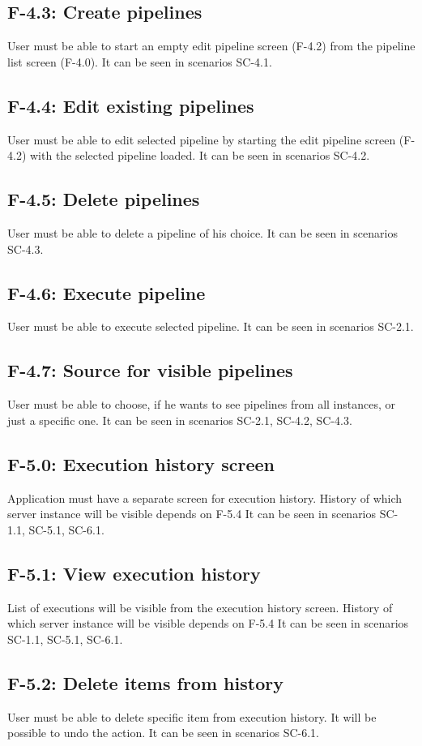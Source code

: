 \subsection*{F-4.3: Create pipelines}
User must be able to start an empty edit pipeline screen (F-4.2) from the pipeline list screen (F-4.0). It can be seen in scenarios SC-4.1.
\subsection*{F-4.4: Edit existing pipelines}
User must be able to edit selected pipeline by starting the edit pipeline screen (F-4.2) with the selected pipeline loaded. It can be seen in scenarios SC-4.2.
\subsection*{F-4.5: Delete pipelines}
User must be able to delete a pipeline of his choice. It can be seen in scenarios SC-4.3.
\subsection*{F-4.6: Execute pipeline}
User must be able to execute selected pipeline. It can be seen in scenarios SC-2.1.
\subsection*{F-4.7: Source for visible pipelines}
User must be able to choose, if he wants to see pipelines from all instances, or just a specific one. It can be seen in scenarios SC-2.1, SC-4.2, SC-4.3.
\subsection*{F-5.0: Execution history screen}
Application must have a separate screen for execution history. History of which server instance will be visible depends on F-5.4 It can be seen in scenarios SC-1.1, SC-5.1, SC-6.1.
\subsection*{F-5.1: View execution history}
List of executions will be visible from the execution history screen. History of which server instance will be visible depends on F-5.4 It can be seen in scenarios SC-1.1, SC-5.1, SC-6.1.
\subsection*{F-5.2: Delete items from history}
User must be able to delete specific item from execution history. It will be possible to undo the action. It can be seen in scenarios SC-6.1.

